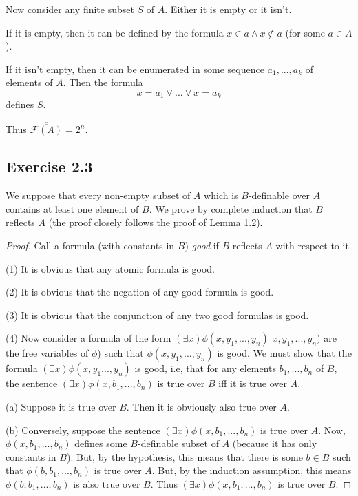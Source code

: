 \documentclass{article}
\theoremstyle{definition}
\begin{document}
Now consider any finite subset $S$ of $A$. Either it is empty or it isn't.

If it is empty, then it can be defined by the formula $x\in a\wedge x\notin a$ (for some 
$a\in A$).

If it isn't empty, then it can be enumerated in some sequence $a_1,...,a_k$ of elements of 
$A$. Then the formula
\[ x=a_1\vee ...\vee x=a_k \] defines $S$.

Thus $\overline{\overline{\mathcal{F}(A)}}=2^n$.

\subsection*{Exercise 2.3}
We suppose that every non-empty subset of $A$ which is $B$-definable over $A$ contains at least one 
element of $B$. We prove by complete induction that $B$ reflects $A$ (the proof closely follows the proof of 
Lemma 1.2). 

\begin{proof}
Call a formula (with constants in $B$) \textit{good} if 
$B$ reflects $A$ with respect to it.

(1) It is obvious that any atomic formula is good.

(2) It is obvious that the negation of any good formula is good.

(3) It is obvious that the conjunction of any two good formulas is good.

(4) Now consider a formula of the form $(\exists x)\phi(x,y_1,...,y_n)$
$x,y_1,...,y_n)$ are the free variables of $\phi$) such that $\phi(x,y_1,...,y_n)$ is good. 
We must show that the formula $(\exists x)\phi(x,y_1...,y_n)$ is good, i.e, that for any 
elements $b_1,...,b_n$ of $B$, the sentence $(\exists x)\phi(x,b_1,...,b_n)$ is true over $B$ iff 
it is true over $A$.

(a) Suppose it is true over $B$. Then it is obviously also true over $A$.

(b) Conversely, suppose the sentence $(\exists x)\phi(x,b_1,...,b_n)$ is true over 
$A$. Now, $\phi(x,b_1,...,b_n)$ defines some $B$-definable subset of $A$ (because it 
has only constants in $B$). But, by the hypothesis, this means that there is some $b\in B$
such that $\phi(b,b_1,...,b_n)$ is true over $A$. But, by the induction assumption, this means 
$\phi(b,b_1,...,b_n)$ is also true over $B$. Thus $(\exists x)\phi(x,b_1,...,b_n)$ is true over 
$B$.
\end{proof}
\end{document}

